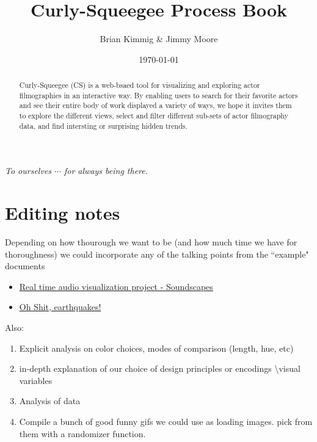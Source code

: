 \documentclass[12pt]{article}
\title{Curly-Squeegee Process Book}
\author{ Brian Kimmig \& Jimmy Moore}
\date{\today}
\begin{document}
\maketitle

\begin{abstract}
	Curly-Squeegee (CS) is a web-bsaed tool for visualizing and exploring actor filmographies in an interactive way. By enabling users to search for their favorite actors and see their entire body of work displayed a variety of ways, we hope it invites them to explore the different views, select and filter different sub-sets of actor filmography data, and find intersting or surprising hidden trends.
\end{abstract}

\newpage

\tableofcontents

\newpage


\begin{center}

	\vspace*{\fill}
	\textit{To ourselves $\cdots$ for always being there.}
	\vspace*{\fill}
	
\end{center}

\newpage 

\section{Editing notes}

{\color{red}

Depending on how thourough we want to be (and how much time we have for thoroughness) we could incorporate any of the talking points from the ``example" documents
\begin{itemize}
	\item \href{http://dataviscourse.net/2015/assets/process_books/bansal_cao_hou.pdf}{Real time audio visualization project - Soundscapes}
	\item \href{http://dataviscourse.net/2015/assets/process_books/walsh_trevino_bett.pdf}{Oh Shit, earthquakes!}

\end{itemize}

Also:
\begin{enumerate}
	\item Explicit analysis on color choices, modes of comparison (length, hue, etc)
	\item in-depth explanation of our  choice of design principles or encodings \textbackslash visual variables
	\item Analysis of data
		\item Compile a bunch of good funny gifs we could use as loading images.  pick from them with a randomizer function.
	
\end{enumerate}
}
\end{document}
